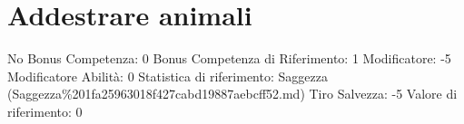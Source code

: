 \section{Addestrare animali}\label{addestrare-animali}

\begin{description}
\tightlist
\item[Tags: ABI]
No Bonus Competenza: 0 Bonus Competenza di Riferimento: 1 Modificatore:
-5 Modificatore Abilità: 0 Statistica di riferimento: Saggezza
(Saggezza\%201fa25963018f427cabd19887aebcff52.md) Tiro Salvezza: -5
Valore di riferimento: 0
\end{description}
